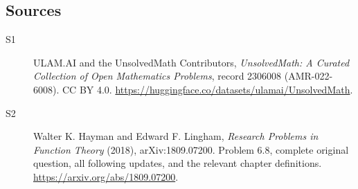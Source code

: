 \documentclass[11pt]{book}
\begin{document}
\subsection{Sources}
\begin{description}
\item[\hypertarget{source:2306008:1}{S1}] ULAM.AI and the UnsolvedMath Contributors, \emph{UnsolvedMath: A Curated Collection of Open Mathematics Problems}, record 2306008 (AMR-022-6008). CC BY 4.0. \url{https://huggingface.co/datasets/ulamai/UnsolvedMath}.
\item[\hypertarget{source:2306008:2}{S2}] Walter K. Hayman and Edward F. Lingham, \emph{Research Problems in Function Theory} (2018), arXiv:1809.07200. Problem 6.8, complete original question, all following updates, and the relevant chapter definitions. \url{https://arxiv.org/abs/1809.07200}.
\end{description}
\label{end:2306008}
\end{document}
